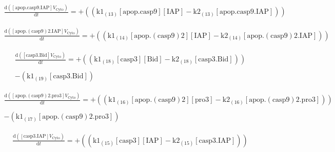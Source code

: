 \documentclass[a4paper,12pt]{article} %
\newcommand{\M}[1]{\mathrm{#1}}
\begin{document}
\begin{equation}
\begin{split}
\frac {\M{d}( {{\M{[apop.casp9.IAP]}}    {V}_{\M{Cyto}} } ) }  {\M{d}{t} }  =  {  +  (( {{\M{k1}}_{\M{(13)}}    {\M{[apop.casp9]}}    {\M{[IAP]}}  -  {\M{k2}}_{\M{(13)}}    {\M{[apop.casp9.IAP]}} } )) }
\end{split}
\end{equation}

\begin{equation}
\begin{split}
\frac {\M{d}( {{\M{[apop.(casp9)2.IAP]}}    {V}_{\M{Cyto}} } ) }  {\M{d}{t} }  =  {  +  (( {{\M{k1}}_{\M{(14)}}    {\M{[apop.(casp9)2]}}    {\M{[IAP]}}  -  {\M{k2}}_{\M{(14)}}    {\M{[apop.(casp9)2.IAP]}} } )) }
\end{split}
\end{equation}



\begin{equation}
\begin{split}
\frac {\M{d}( {{\M{[casp3.Bid]}}    {V}_{\M{Cyto}} } ) }  {\M{d}{t} }  =  {  +  (( {{\M{k1}}_{\M{(18)}}    {\M{[casp3]}}    {\M{[Bid]}}  -  {\M{k2}}_{\M{(18)}}    {\M{[casp3.Bid]}} } )) } \\ 
  \\ 
   {  -  ( {{\M{k1}}_{\M{(19)}}    {\M{[casp3.Bid]}} } ) }
\end{split}
\end{equation}

\begin{equation}
\begin{split}
\frac {\M{d}( {{\M{[apop.(casp9)2.pro3]}}    {V}_{\M{Cyto}} } ) }  {\M{d}{t} }  =  {  +  (( {{\M{k1}}_{\M{(16)}}    {\M{[apop.(casp9)2]}}    {\M{[pro3]}}  -  {\M{k2}}_{\M{(16)}}    {\M{[apop.(casp9)2.pro3]}} } )) } \\ 
  \\ 
   {  -  ( {{\M{k1}}_{\M{(17)}}    {\M{[apop.(casp9)2.pro3]}} } ) }
\end{split}
\end{equation}


\begin{equation}
\begin{split}
\frac {\M{d}( {{\M{[casp3.IAP]}}    {V}_{\M{Cyto}} } ) }  {\M{d}{t} }  =  {  +  (( {{\M{k1}}_{\M{(15)}}    {\M{[casp3]}}    {\M{[IAP]}}  -  {\M{k2}}_{\M{(15)}}    {\M{[casp3.IAP]}} } )) }
\end{split}
\end{equation}
\end{document}

